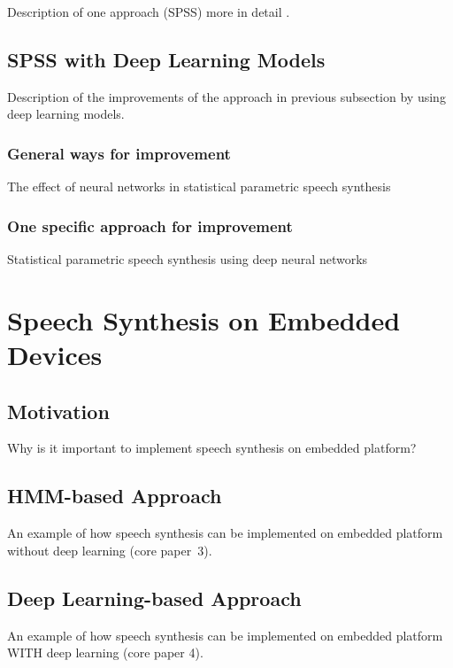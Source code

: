 Description of one approach (\ac{SPSS}) more in detail \cite{zen:statistical}.

\subsection{\ac{SPSS} with Deep Learning Models}
\label{subsec:deepspeech}

Description of the improvements of the approach in previous subsection by using deep learning models.

\subsubsection{General ways for improvement}

The effect of neural networks in statistical parametric speech synthesis \cite{hashimoto:effect}\\

\subsubsection{One specific approach for improvement}

Statistical parametric speech synthesis using deep neural networks \cite{zen:deepstatistical}

\section{Speech Synthesis on Embedded Devices}
\label{sec:embeddedspeech}

\subsection{Motivation}

Why is it important to implement speech synthesis on embedded platform?

\subsection{\ac{HMM}-based Approach}
\label{subsec:hmmembedded}

An example of how speech synthesis can be implemented on embedded platform without deep learning (core paper~3).

\subsection{Deep Learning-based Approach}
\label{subsec:deepembedded}

An example of how speech synthesis can be implemented on embedded platform WITH deep learning (core paper 4).

\clearpage